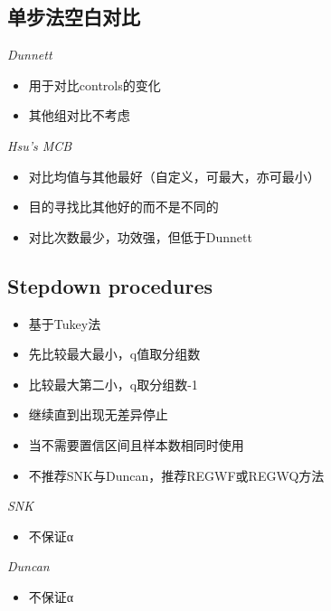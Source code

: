 \documentclass[]{tufte-book}
\providecommand{\tightlist}{%
  \setlength{\itemsep}{0pt}\setlength{\parskip}{0pt}}
\begin{document}
\hypertarget{ux5355ux6b65ux6cd5ux7a7aux767dux5bf9ux6bd4}{%
\subsection{单步法空白对比}\label{ux5355ux6b65ux6cd5ux7a7aux767dux5bf9ux6bd4}}

\emph{Dunnett}

\begin{itemize}
\tightlist
\item
  用于对比controls的变化
\item
  其他组对比不考虑
\end{itemize}

\emph{Hsu's MCB}

\begin{itemize}
\tightlist
\item
  对比均值与其他最好（自定义，可最大，亦可最小）
\item
  目的寻找比其他好的而不是不同的
\item
  对比次数最少，功效强，但低于Dunnett
\end{itemize}

\hypertarget{stepdown-procedures}{%
\subsection{Stepdown procedures}\label{stepdown-procedures}}

\begin{itemize}
\tightlist
\item
  基于Tukey法
\item
  先比较最大最小，q值取分组数
\item
  比较最大第二小，q取分组数-1
\item
  继续直到出现无差异停止
\item
  当不需要置信区间且样本数相同时使用
\item
  不推荐SNK与Duncan，推荐REGWF或REGWQ方法
\end{itemize}

\emph{SNK}

\begin{itemize}
\tightlist
\item
  不保证α
\end{itemize}

\emph{Duncan}

\begin{itemize}
\tightlist
\item
  不保证α
\end{itemize}
\end{document}
